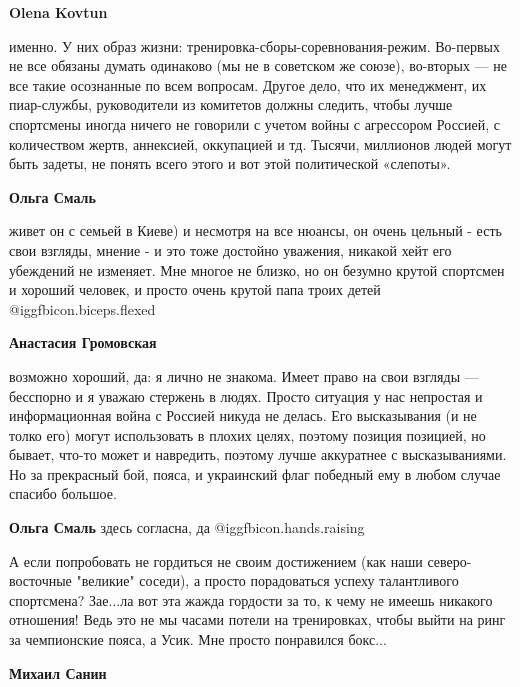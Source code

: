 \begin{itemize}
\begin{itemize}
\textbf{Olena Kovtun} 

именно. У них образ жизни: тренировка-сборы-соревнования-режим. Во-первых не
все обязаны думать одинаково (мы не в советском же союзе), во-вторых — не все
такие осознанные по всем вопросам. Другое дело, что их менеджмент, их
пиар-службы, руководители из комитетов должны следить, чтобы лучше спортсмены
иногда ничего не говорили с учетом войны с агрессором Россией, с количеством
жертв, аннексией, оккупацией и тд. Тысячи, миллионов людей могут быть задеты,
не понять всего этого и вот этой политической «слепоты».

\textbf{Ольга Смаль} 

живет он с семьей в Киеве) и несмотря на все нюансы, он очень цельный - есть
свои взгляды, мнение - и это тоже достойно уважения, никакой хейт его убеждений
не изменяет. Мне многое не близко, но он безумно крутой спортсмен и хороший
человек, и просто очень крутой папа троих детей @igg{fbicon.biceps.flexed} 


\textbf{Анастасия Громовская} 

возможно хороший, да: я лично не знакома. Имеет право на свои взгляды —
бесспорно и я уважаю стержень в людях. Просто ситуация у нас непростая и
информационная война с Россией никуда не делась. Его высказывания (и не толко
его) могут использовать в плохих целях, поэтому позиция позицией, но бывает,
что-то может и навредить, поэтому лучше аккуратнее с высказываниями. Но за
прекрасный бой, пояса, и украинский флаг победный ему в любом случае спасибо
большое.

\textbf{Ольга Смаль} здесь согласна, да @igg{fbicon.hands.raising} 

\end{itemize} %


А если попробовать не гордиться не своим достижением (как наши северо-восточные
"великие" соседи), а просто порадоваться успеху талантливого спортсмена?
Зае...ла вот эта жажда гордости за то, к чему не имеешь никакого отношения!
Ведь это не мы часами потели на тренировках, чтобы выйти на ринг за чемпионские
пояса, а Усик. Мне просто понравился бокс...

\begin{itemize} %
\textbf{Михаил Санин} 


\end{itemize}
\end{itemize}
